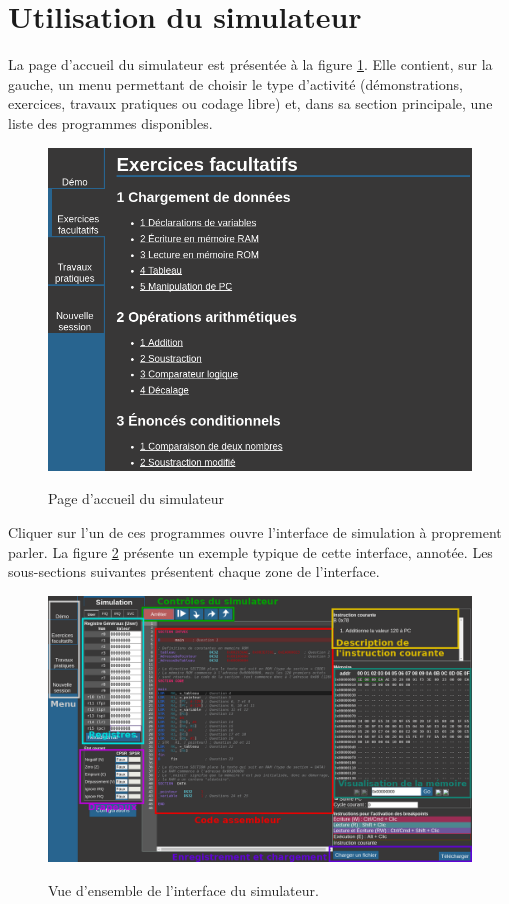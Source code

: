 \documentclass{tufte-handout}
\begin{document}
\paragraph{\textbf{\color{red}{Note importante :}}} \textbf{}

\section{Utilisation du simulateur}

La page d'accueil du simulateur est présentée à la figure \ref{f:accueil}. Elle contient, sur la gauche, un menu permettant de choisir le type d'activité (démonstrations, exercices, travaux pratiques ou codage libre) et, dans sa section principale, une liste des programmes disponibles.

\begin{figure}
\raggedleft
\includegraphics[width=0.7\linewidth]{pics/accueil.png}
\label{f:accueil}
\caption{Page d'accueil du simulateur}
\end{figure}

Cliquer sur l'un de ces programmes ouvre l'interface de simulation à proprement parler. La figure \ref{f:global} présente un exemple typique de cette interface, annotée. Les sous-sections suivantes présentent chaque zone de l'interface.

\begin{figure}[h!]
\includegraphics[width=0.86\linewidth]{pics/main_labeled.png}
\label{f:global}
\caption{Vue d'ensemble de l'interface du simulateur.}
\end{figure}
\end{document}
